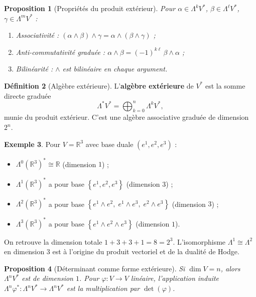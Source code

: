 \documentclass[12pt,a4paper,openany]{book}
\theoremstyle{definition}
\newtheorem{definition}{Définition}[chapter]
\newtheorem{exemple}[definition]{Exemple}
\theoremstyle{plain}
\newtheorem{proposition}[definition]{Proposition}
\theoremstyle{remark}
\newcommand{\R}{\mathbb{R}}
\newcommand{\set}[1]{\left\{#1\right\}}
\begin{document}
\begin{proposition}[Propriétés du produit extérieur]%
\label{prop:proprietes-wedge}
Pour $\alpha \in \Lambda^k V^*$, $\beta \in \Lambda^\ell V^*$,
$\gamma \in \Lambda^m V^*$ :
\begin{enumerate}[label=\textup{(\roman*)}]
  \item \emph{Associativité :}
    $(\alpha \wedge \beta) \wedge \gamma =
      \alpha \wedge (\beta \wedge \gamma)$ ;
  \item \emph{Anti-commutativité graduée :}
    $\alpha \wedge \beta = (-1)^{k\ell}\, \beta \wedge \alpha$ ;
  \item \emph{Bilinéarité :} $\wedge$ est bilinéaire en chaque argument.
\end{enumerate}
\end{proposition}

\begin{definition}[Algèbre extérieure]\label{def:algebre-exterieure-totale}%
L'\textbf{algèbre extérieure} de $V^*$ est la somme directe graduée
\[
  \Lambda^* V^* = \bigoplus_{k=0}^{n} \Lambda^k V^*,
\]
munie du produit extérieur. C'est une algèbre associative graduée de
dimension $2^n$.
\end{definition}

\begin{exemple}\label{ex:algebre-ext-R3}
Pour $V = \R^3$ avec base duale $(e^1, e^2, e^3)$ :
\begin{itemize}
  \item $\Lambda^0(\R^3)^* \cong \R$ (dimension $1$) ;
  \item $\Lambda^1(\R^3)^*$ a pour base $\set{e^1, e^2, e^3}$
    (dimension $3$) ;
  \item $\Lambda^2(\R^3)^*$ a pour base
    $\set{e^1 \wedge e^2,\; e^1 \wedge e^3,\; e^2 \wedge e^3}$
    (dimension $3$) ;
  \item $\Lambda^3(\R^3)^*$ a pour base
    $\set{e^1 \wedge e^2 \wedge e^3}$ (dimension $1$).
\end{itemize}
On retrouve la dimension totale $1 + 3 + 3 + 1 = 8 = 2^3$.
L'isomorphisme $\Lambda^1 \cong \Lambda^2$ en dimension $3$ est à
l'origine du produit vectoriel et de la dualité de Hodge.
\end{exemple}

\begin{proposition}[Déterminant comme forme extérieure]%
\label{prop:determinant-exterieur}
Si $\dim V = n$, alors $\Lambda^n V^*$ est de dimension $1$. Pour
$\varphi \colon V \to V$ linéaire, l'application induite
$\Lambda^n \varphi^* \colon \Lambda^n V^* \to \Lambda^n V^*$ est la
multiplication par $\det(\varphi)$.
\end{proposition}
\end{document}
